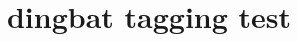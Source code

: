 \documentclass{article}
\title{dingbat tagging test}
\begin{document}
\rightpointright

\leftpointright

\squarewithdots

\largepencil
\end{document}
